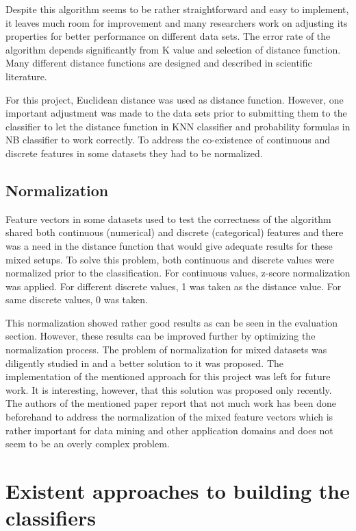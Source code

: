 \documentclass{llncs}
\begin{document}
Despite this algorithm seems to be rather straightforward and easy to implement, it leaves much room for improvement and many researchers work on adjusting its properties for better performance on different data sets. The error rate of the algorithm depends significantly from K value and selection of distance function. Many different distance functions are designed and described in scientific literature.

For this project, Euclidean distance was used as distance function. However, one important adjustment was made to the data sets prior to submitting them to the classifier to let the distance function in KNN classifier and probability formulas in NB classifier to work correctly. To address the co-existence of continuous and discrete features in some datasets they had to be normalized.  

\subsection{Normalization}

Feature vectors in some datasets used to test the correctness of the algorithm shared both continuous (numerical) and discrete (categorical) features and there was a need in the distance function that would give adequate results for these mixed setups. To solve this problem, both continuous and discrete values were normalized prior to the classification. For continuous values, z-score normalization was applied. For different discrete values, 1 was taken as the distance value. For same discrete values, 0 was taken.

This normalization showed rather good results as can be seen in the evaluation section. However, these results can be improved further by optimizing the normalization process. The problem of normalization for mixed datasets was diligently studied in \cite{Suarez} and a better solution to it was proposed. The implementation of the mentioned approach for this project was left for future work. It is interesting, however, that this solution was proposed only recently. The authors of the mentioned paper report that not much work has been done beforehand to address the normalization of the mixed feature vectors which is rather important for data mining and other application domains and does not seem to be an overly complex problem.

\section{Existent approaches to building the classifiers}
\end{document}
